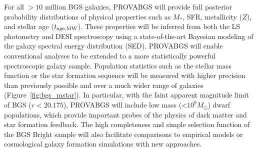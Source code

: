 
For all ${>}10$ million BGS galaxies, PROVABGS will provide full posterior
probability distributions of physical properties such as $M_*$, SFR,
metallicity ($Z$), and stellar age ($t_{\rm age, MW}$). 
These properties will be inferred from both the LS photometry and DESI
spectroscopy using a state-of-the-art Bayesian modeling of the galaxy spectral
energy distribution (SED). 
PROVABGS will enable conventional analyses to be extended to a more
statistically powerful spectroscopic galaxy sample. 
Population statistics such as the stellar mass function or the star formation
sequence will be measured with higher precision than previously possible and
over a much wider range of galaxies (Figure~\ref{fig:bgs_mstar}). 
In particular, with the faint apparent magnitude limit of BGS ($r < 20.175$),
PROVABGS will include low mass (<$10^9M_\odot$) dwarf populations, which
provide important probes of the physics of dark matter and star formation
feedback.
The high completeness and simple selection function of the BGS Bright sample
will also facilitate comparisons to empirical models or cosmological galaxy 
formation simulations with new approaches. 

